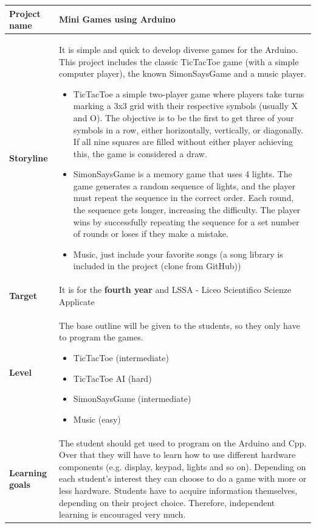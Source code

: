 \documentclass[10pt]{article}
\begin{document}
\begin{longtable}{|p{3.5cm}|p{11cm}|}
  \hline
  \textbf{Project name} & Mini Games using Arduino  \\ \hline
  
  \textbf{Storyline} & It is simple and quick to develop diverse games for the Arduino. This project includes the classic TicTacToe game (with a simple computer player), the known SimonSaysGame and a music player. 
  \begin{itemize}
    \item TicTacToe a simple two-player game where players take turns marking a 3x3 grid with their respective symbols (usually X and O). The objective is to be the first to get three of your symbols in a row, either horizontally, vertically, or diagonally. If all nine squares are filled without either player achieving this, the game is considered a draw.
    \item SimonSaysGame is a memory game that uses 4 lights. The game generates a random sequence of lights, and the player must repeat the sequence in the correct order. Each round, the sequence gets longer, increasing the difficulty. The player wins by successfully repeating the sequence for a set number of rounds or loses if they make a mistake.
    \item Music, just include your favorite songs (a song library is included in the project (clone from GitHub))
  \end{itemize}\\ \hline
  
  \textbf{Target} & It is for the \textbf{fourth year} and LSSA - Liceo Scientifico Scienze Applicate \\ \hline
  
  \textbf{Level} & 
  The base outline will be given to the students, so they only have to program the games.
  \begin{itemize}
    \item TicTacToe (intermediate)
    \item TicTacToe AI (hard)
    \item SimonSaysGame (intermediate)
    \item Music (easy)
  \end{itemize} \\ \hline
  
  \textbf{Learning goals} & The student should get used to program on the Arduino and Cpp. Over that they will have to learn how to use different hardware components (e.g. display, keypad, lights and so on). Depending on each student's interest they can choose to do a game with more or less hardware. Students have to acquire information themselves, depending on their project choice. Therefore, independent learning is encouraged very much. \\ \hline
  

\end{longtable}
\end{document}
